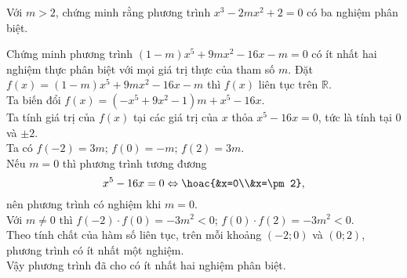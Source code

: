 \begin{bt}[VD]%
Với $m>2$, chứng minh rằng phương trình $x^3-2mx^2+2=0$ có ba nghiệm phân biệt. 
\end{bt}
\begin{bt}[VD]%
Chứng minh phương trình $\left(1-m\right)x^5+9mx^2-16x-m=0$ có ít nhất hai nghiệm thực phân biệt với mọi giá trị thực của tham số $m$.
\loigiai
{Đặt $f(x)=\left(1-m\right)x^5+9mx^2-16x-m$ thì $f(x)$ liên tục trên $\mathbb{R}$.\\ 
Ta biến đổi $f(x)=\left(-x^5+9x^2-1\right)m+x^5-16x$. \\
Ta tính giá trị của $f(x)$ tại các giá trị của $x$ thỏa $x^5-16x=0$, tức là tính tại $0$ và $\pm 2$.\\
Ta có $f(-2)=3m$; $f(0)=-m$; $f(2)=3m$.\\
Nếu $m=0$ thì phương trình tương đương $$x^5-16x=0\Leftrightarrow \hoac{&x=0\\&x=\pm2},$$ nên phương trình có nghiệm khi $m=0$.\\
Với $m\ne 0$ thì $f(-2)\cdot f(0)=-3m^2<0$; $f(0)\cdot f(2)=-3m^2<0$. \\
Theo tính chất của hàm số liên tục, trên mỗi khoảng $(-2;0)$ và $(0;2)$, phương trình có ít nhất một nghiệm.\\
Vậy phương trình đã cho có ít nhất hai nghiệm phân biệt.
}
\end{bt}
